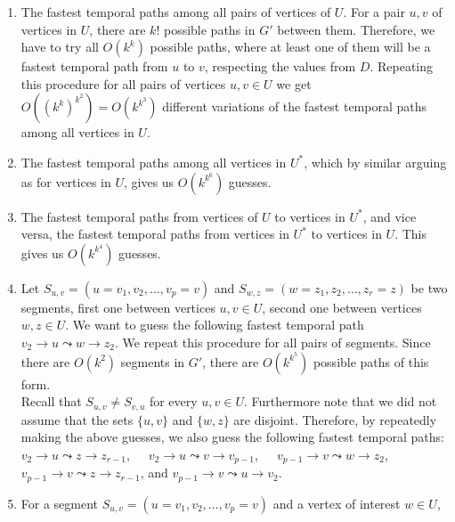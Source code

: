 \documentclass[11pt,a4paper]{article}
\theoremstyle{remark}
\theoremstyle{definition}
\newcommand{\deltaExact}{\textsc{Simple $\Delta$-TGR}}
\begin{document}
\begin{enumerate}[G-1.]
    \item \label{FPT-guessFTPamongU}
    The fastest temporal paths among all pairs of vertices of $U$.
    For a pair $u,v$ of vertices in $U$, there are $k!$ possible paths in $G'$ between them. 
    Therefore, we have to try all $O(k^k)$ possible paths, where at least one of them will be a fastest temporal path from $u$ to $v$, respecting the values from $D$.
    Repeating this procedure for all pairs of vertices $u,v \in U$ we get $O((k^k)^{k^2})=O(k^{k^3})$ different variations of the fastest temporal paths among all vertices in $U$.
    \item \label{FPT-guessFTPamongUstar}
    The fastest temporal paths among all vertices in $U^*$, 
    which by similar arguing as for vertices in $U$, gives us $O(k^{k^6})$ guesses.
    \item \label{FPT-guessFTPamongUandUstar}
    The fastest temporal paths from vertices of $U$ to vertices in $U^*$,
    and vice versa, the fastest temporal paths from vertices in $U^*$ to vertices in $U$.
    This gives us $O(k^{k^4})$ guesses.
    \item \label{FPT-guessFTPamongv2z2}
    Let $S_{u,v} = (u=v_1,v_2, \dots, v_p = v)$ and $S_{w,z} = (w=z_1,z_2, \dots, z_r = z)$ be two segments,
    first one between vertices $u,v \in U$, second one between vertices $w, z \in U$.
    We want to guess the following fastest temporal path
    $v_2 \rightarrow u \leadsto w \rightarrow z_2$. 
    We repeat this procedure for all pairs of segments.
    Since there are $O(k^2)$ segments in $G'$,
    there are $O(k^{k^5})$ possible paths of this form. \\
    Recall that $S_{u,v}\neq S_{v,u}$ for every $u,v\in U$. Furthermore note that we did not assume that the sets $\{u,v\}$ and $\{w,z\}$ are disjoint. Therefore, by repeatedly making the above guesses, we also guess the following fastest temporal paths: 
    ${v_2 \rightarrow u \leadsto z \rightarrow z_{r-1}}$,\ \ \ 
    ${v_2 \rightarrow u \leadsto v \rightarrow v_{p-1}}$,\ \ \  
    ${v_{p-1} \rightarrow v \leadsto w \rightarrow z_{2}}$,\ \ \  
    ${v_{p-1} \rightarrow v \leadsto z \rightarrow z_{r-1}}$, and  
    ${v_{p-1} \rightarrow v \leadsto u \rightarrow v_{2}}$.
    \item \label{FPT:guess-uToSegmentz2}
    For a segment $S_{u,v} = (u=v_1,v_2, \dots, v_p = v)$
    and a vertex of interest $w \in U$,

\end{enumerate}
\end{document}
